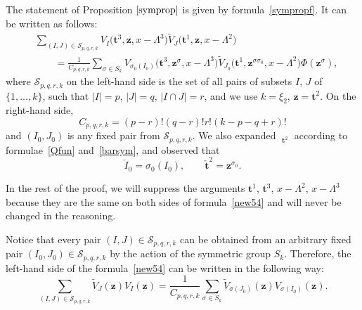 \documentclass[10pt,a4paper]{amsart}
\numberwithin{equation}{section}
\DeclareMathOperator{\Symb}{\overline{Sym} }
\begin{document}
The statement of Proposition $\ref{symprop}$ is given by formula~\eqref{sympropf}. It can be written as follows:
\begin{align}
&\sum\limits_{(I,J)\in \mathcal{S}_{p,q,r,k}}V_{I}\bigl(\boldsymbol{t}^3, \boldsymbol{z},x-\Lambda^3\bigr) \widetilde{V}_{J}\bigl( \boldsymbol{t}^1, \boldsymbol{z},x-\Lambda^2\bigr) \nonumber\\
&\qquad{}=\frac{1}{C_{p,q,r,k}}\sum_{\sigma\in S_k} V_{\sigma_0({I}_0)}\bigl(\boldsymbol{t}^3, \boldsymbol{z}^{\sigma},x-\Lambda^3\bigr) \widetilde{V}_{J_0}\bigl( \boldsymbol{t}^1, \boldsymbol{z}^{\sigma\sigma_0},x-\Lambda^2\bigr) \Phi(\boldsymbol{z}^\sigma),\label{new54}
\end{align}
where $\mathcal S_{p,q,r,k}$ on the left-hand side is the set of all pairs of subsets $I$, $J$ of $\{1,\dots,k \}$, such that $|I|=p$, $|J|=q$, $|I\cap J|=r$, and we use $k=\xi_2$, $\boldsymbol{z}=\boldsymbol{t}^2$. On the right-hand side,
\[
C_{p,q,r,k}= (p-r)!(q-r)! r!(k-p-q+r)!
\]
 and $(I_0,J_0)$  is any fixed pair from $\mathcal S_{p,q,r,k}$. We also expanded $\Symb_{\boldsymbol{t}^2}$ according to formulae~\eqref{Qfun} and~\eqref{barsym}, and observed that
 \[
 \check{I}_0=\sigma_0(I_0) , \qquad \check{\boldsymbol{t}}^2=\boldsymbol{z}^{\sigma_0}.
 \]

In the rest of the proof, we will suppress the arguments $\boldsymbol{t}^1$, $\boldsymbol{t}^3$, $x-\Lambda^2$, $x-\Lambda^3$ because they are the same on both sides of formula~\eqref{new54} and will never be changed in the reasoning.

Notice that every pair $(I,J)\in \mathcal{S}_{p,q,r,k}$ can be obtained from an arbitrary fixed pair $(I_0,J_0) \in \mathcal{S}_{p,q,r,k}$ by the action of the symmetric group $S_k$. Therefore, the left-hand side of the formula~\eqref{new54} can be written in the following way:
\begin{equation}\label{twosums}
\sum_{(I,J)\in \mathcal{S}_{p,q,r,k}}\widetilde{V}_J( \boldsymbol{z}) V_I(\boldsymbol{z})=\frac{1}{C_{p,q,r,k}}\sum_{\sigma\in S_k} \widetilde{V}_{\sigma(J_0)}(\boldsymbol{z}) V_{\sigma(I_0)}(\boldsymbol{z} ).
\end{equation}
\end{document}
